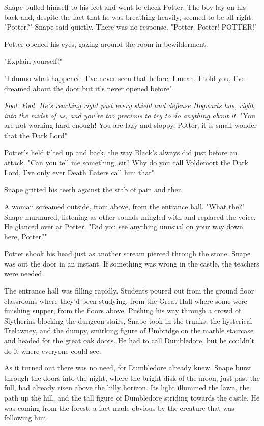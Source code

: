 Snape pulled himself to his feet and went to check Potter. The boy lay on his back and, despite the fact that he was breathing heavily, seemed to be all right. "Potter?" Snape said quietly. There was no response. "Potter. Potter! POTTER!"

Potter opened his eyes, gazing around the room in bewilderment.

"Explain yourself!"

"I{\el} dunno what happened. I've never seen that before. I mean, I told you, I've dreamed about the door{\el} but it's never opened before{\el}"

\emph{Fool. Fool. He's reaching right past every shield and defense Hogwarts has, right into the midst of us, and you're too precious to try to do anything about it.} "You are not working hard enough! You are lazy and sloppy, Potter, it is small wonder that the Dark Lord{\el}"

Potter's held tilted up and back, the way Black's always did just before an attack. "Can you tell me something, sir? Why do you call Voldemort the Dark Lord, I've only ever Death Eaters call him that{\el}"

Snape gritted his teeth against the stab of pain and then{\el}

A woman screamed outside, from above, from the entrance hall. "What the{\el}?" Snape murmured, listening as other sounds mingled with and replaced the voice. He glanced over at Potter. "Did you see anything unusual on your way down here, Potter?"

Potter shook his head just as another scream pierced through the stone. Snape was out the door in an instant. If something was wrong in the castle, the teachers were needed.

The entrance hall was filling rapidly. Students poured out from the ground floor classrooms where they'd been studying, from the Great Hall where some were finishing supper, from the floors above. Pushing his way through a crowd of Slytherins blocking the dungeon stairs, Snape took in the trunks, the hysterical Trelawney, and the dumpy, smirking figure of Umbridge on the marble staircase and headed for the great oak doors. He had to call Dumbledore, but he couldn't do it where everyone could see.

As it turned out there was no need, for Dumbledore already knew. Snape burst through the doors into the night, where the bright disk of the moon, just past the full, had already risen above the hilly horizon. Its light illumined the lawn, the path up the hill, and the tall figure of Dumbledore striding towards the castle. He was coming from the forest, a fact made obvious by the creature that was following him.

